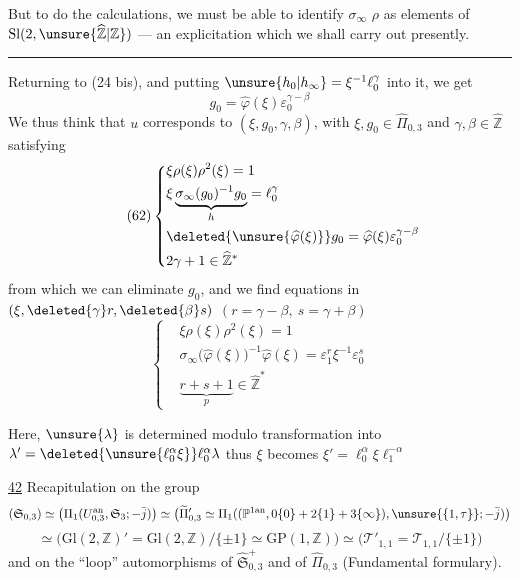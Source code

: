 

But to do the calculations, we must be able to identify $\sigma_\infty$
 $\rho$ as elements of
$\mathrm{Sl}(2,\unsure{\widehat{\mathbb Z}|\mathbb Z})$
--- an explicitation which we shall carry out presently.

\begin{center}\rule{2cm}{0.4pt}\end{center}

Returning to (24 bis), and putting
$\unsure{h_0|h_\infty}=\xi^{-1}\ell_0^{\gamma}$ into it, we get
\[
\tag{61}
g_0=\widehat{\varphi}(\xi)
\varepsilon_0^{\gamma-\beta}
\]
We thus think that $u$ corresponds to
$(\xi,g_0,\gamma,\beta)$,
with $\xi,g_0\in\widehat{\Pi}_{0,3}$
and $\gamma,\beta\in\widehat{\mathbb Z}$
satisfying
\[
\tag{62}
\left\{
\begin{aligned}
&\xi\rho(\xi)\rho^2(\xi)=1\\
&\xi\underbrace{\sigma_\infty(g_0)^{-1}g_0}_{h}
=\ell_0^{\gamma}\\
&\deleted{\unsure{\widehat{\varphi}(\xi)}}g_0
=\widehat{\varphi}(\xi)
\varepsilon_0^{\gamma-\beta}\\
&2\gamma+1\in\widehat{\mathbb Z}^{*}
\end{aligned}
\right.
\]
from which we can eliminate $g_0$, and we find equations in
$(\xi,\deleted{\gamma}r,\deleted{\beta}s)$
$(r=\gamma-\beta,\ s=\gamma+\beta)$
\[
\tag{63}
\left\{
\begin{aligned}
&\xi\rho(\xi)\rho^2(\xi)=1\\
&\sigma_\infty\bigl(\widehat{\varphi}(\xi)\bigr)^{-1}
\widehat{\varphi}(\xi)
=\varepsilon_1^r\xi^{-1}\varepsilon_0^s\\
&\underbrace{r+s+1}_{p}\in\widehat{\mathbb Z}^{*}
\end{aligned}
\right.
\]

Here, $\unsure{\lambda}$ is determined modulo transformation into
$\lambda'=\deleted{\unsure{\ell_0^{\alpha}\xi}}\ell_0^\alpha\lambda$
thus $\xi$ becomes
$\xi'=\ell_0^\alpha\xi\ell_1^{-\alpha}$



\uline{42} Recapitulation on the group
\[
(\mathfrak S_{0,3})
\simeq
\bigl(\Pi_1(U_{0,3}^{\mathrm{an}},\mathfrak S_3;-\bar j)\bigr)
\simeq
\bigl(\widetilde\Pi'_{0,3}\simeq
\Pi_1((\mathbb P^{1\mathrm{an}},0\{0\}+2\{1\}+3\{\infty\}),\unsure{\{1,\tau\}};-\bar j)\bigr)
\]
\[
\simeq\bigl(\mathrm{Gl}(2,\mathbb Z)'=\mathrm{Gl}(2,\mathbb Z)/\{\pm1\}
\simeq\mathrm{GP}(1,\mathbb Z)\bigr)
\simeq\bigl(\mathcal T'_{1,1}=\mathcal T_{1,1}/\{\pm1\}\bigr)
\]
and on the ``loop'' automorphisms of
$\widehat{\mathfrak S}_{0,3}^{+}$ and of
$\widehat\Pi_{0,3}$ (Fundamental formulary).

